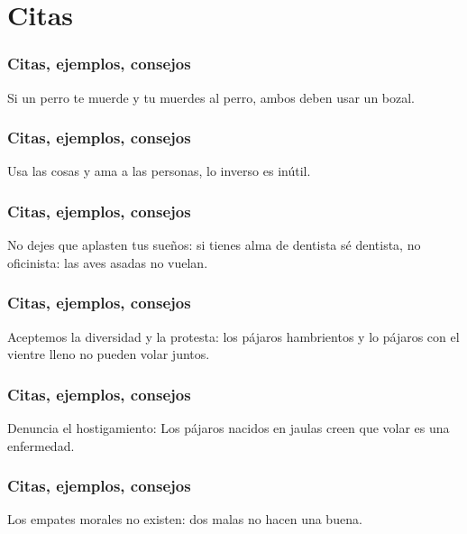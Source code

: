 \documentclass[12pt,spanish,x11names]{beamer}
\begin{document}
\section{Citas}
\begin{frame}
  \frametitle{Citas, ejemplos, consejos}
\begin{block}{}
  Si un perro te muerde y tu muerdes al perro, ambos deben usar un bozal.
\end{block}
\end{frame}
\begin{frame}
  \frametitle{Citas, ejemplos, consejos}
  \begin{block}{}
    Usa las cosas y ama a las personas, lo inverso es inútil.
  \end{block}
\end{frame}
\begin{frame}
  \frametitle{Citas, ejemplos, consejos}
  \begin{block}{}
    No dejes que aplasten tus sueños: si tienes alma de dentista sé dentista, no oficinista: las aves asadas no vuelan.
  \end{block}
\end{frame}
\begin{frame}
  \frametitle{Citas, ejemplos, consejos}
  \begin{block}{}
    Aceptemos la diversidad y la protesta: los pájaros hambrientos y lo pájaros con el vientre lleno no pueden volar juntos.
  \end{block}
\end{frame}
\begin{frame}
  \frametitle{Citas, ejemplos, consejos}
  \begin{block}{}
    Denuncia el hostigamiento: Los pájaros nacidos en jaulas creen que volar es una enfermedad. 
  \end{block}
\end{frame}
\begin{frame}
  \frametitle{Citas, ejemplos, consejos}
  \begin{block}{}
    Los empates morales no existen: dos malas no hacen una buena.
  \end{block}
\end{frame}
\end{document}
